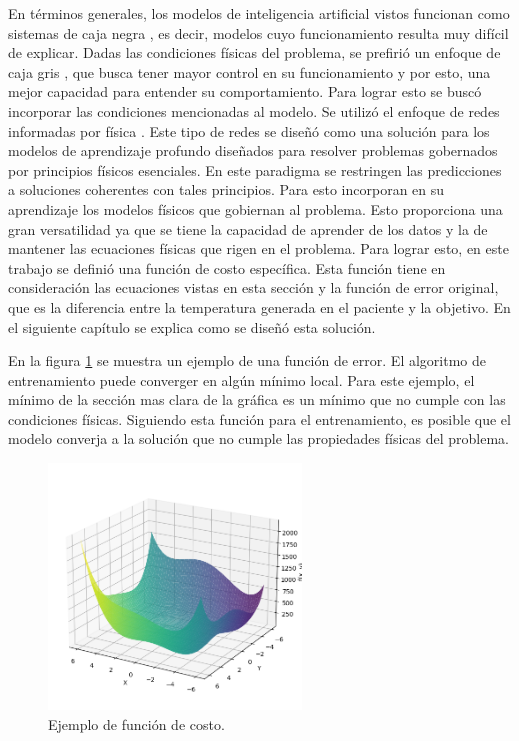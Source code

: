 En términos generales, los modelos de inteligencia artificial vistos funcionan como sistemas de caja negra \citep{ML_methods}, es decir, modelos cuyo funcionamiento resulta muy difícil de explicar. Dadas las condiciones físicas del problema, se prefirió un enfoque de caja gris \citep{YANG2024121523}, que busca tener mayor control en su funcionamiento y por esto, una mejor capacidad para entender su comportamiento.
Para lograr esto se buscó incorporar las condiciones mencionadas al modelo. Se utilizó el enfoque de redes informadas por física \citep{cuomo2022scientificmachinelearningphysicsinformed}. Este tipo de redes se diseñó como una solución para los modelos de aprendizaje profundo diseñados para resolver problemas gobernados por principios físicos esenciales. En este paradigma se restringen las predicciones a soluciones coherentes con tales principios. Para esto incorporan en su aprendizaje los modelos físicos que gobiernan al problema. Esto proporciona una gran versatilidad ya que se tiene la capacidad de aprender de los datos y la de mantener las ecuaciones físicas que rigen en el problema. Para lograr esto, en este trabajo se definió una función de costo específica. Esta función tiene en consideración las ecuaciones vistas en esta sección y la función de error original, que es la diferencia entre la temperatura generada en el paciente y la objetivo. En el siguiente capítulo se explica como se diseñó esta solución.

En la figura \ref{fig:loss} se muestra un ejemplo de una función de error. El algoritmo de entrenamiento puede converger en algún mínimo local. Para este ejemplo, el mínimo de la sección mas clara de la gráfica es un mínimo que no cumple con las condiciones físicas. Siguiendo esta función para el entrenamiento, es posible que el modelo converja a la solución que no cumple las propiedades físicas del problema. 

\begin{figure}[htbp]
	\centering
	\includegraphics[width=0.6\textwidth]{./Figures/loss_example.png}
	\caption{Ejemplo de función de costo.}
	\label{fig:loss}
\end{figure}


